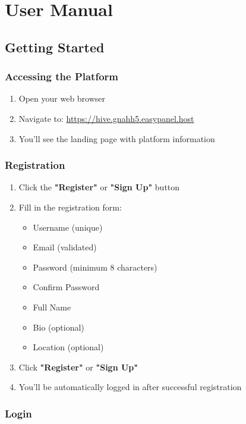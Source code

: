 \documentclass[12pt,a4paper]{report}
\begin{document}
\chapter{User Manual}

\section{Getting Started}

\subsection{Accessing the Platform}

\begin{enumerate}
    \item Open your web browser
    \item Navigate to: \url{https://hive.gnahh5.easypanel.host}
    \item You'll see the landing page with platform information
\end{enumerate}

\subsection{Registration}

\begin{enumerate}
    \item Click the \textbf{"Register"} or \textbf{"Sign Up"} button
    \item Fill in the registration form:
          \begin{itemize}
              \item Username (unique)
              \item Email (validated)
              \item Password (minimum 8 characters)
              \item Confirm Password
              \item Full Name
              \item Bio (optional)
              \item Location (optional)
          \end{itemize}
    \item Click \textbf{"Register"} or \textbf{"Sign Up"}
    \item You'll be automatically logged in after successful registration
\end{enumerate}

\subsection{Login}
\end{document}
